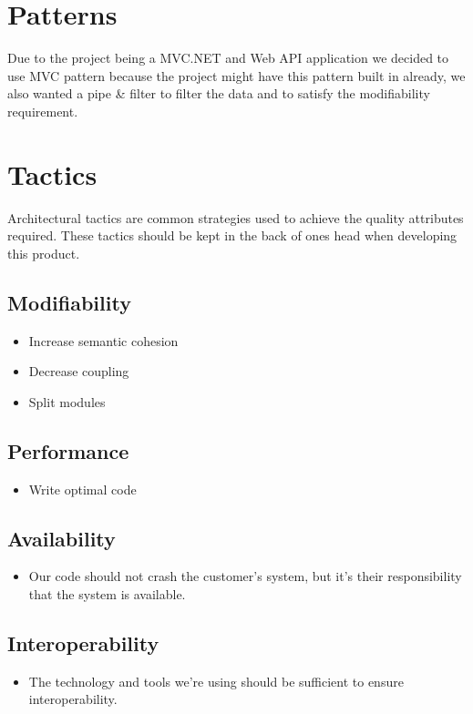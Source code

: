 \section{Patterns}
Due to the project being a MVC.NET and Web API application we decided to use MVC pattern because the project might have this pattern built in already, we also wanted a pipe \& filter to filter the data and to satisfy the modifiability requirement.

\section{Tactics}
Architectural tactics are common strategies used to achieve the quality attributes required. These tactics should be kept in the back of ones head when developing this product.
\subsection{Modifiability}
\begin{itemize}
\item Increase semantic cohesion
\item Decrease coupling
\item Split modules
\end{itemize}

\subsection{Performance}
\begin{itemize}
\item Write optimal code
\end{itemize}

\subsection{Availability}
\begin{itemize}
\item Our code should not crash the customer's system, but it's their responsibility that the system is available.
\end{itemize}

\subsection{Interoperability}
\begin{itemize}
\item The technology and tools we're using should be sufficient to ensure interoperability.
\end{itemize}

